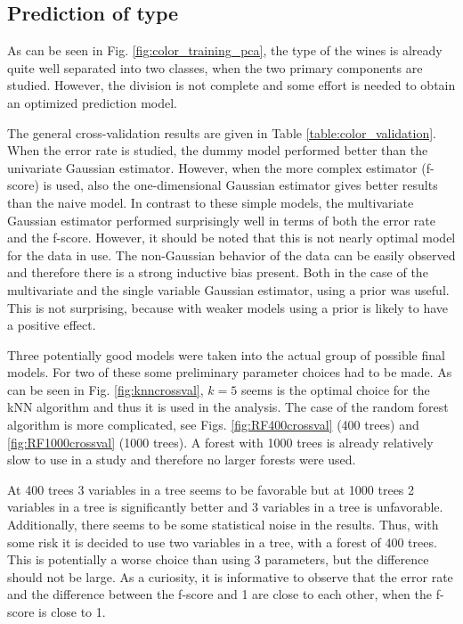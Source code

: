 \documentclass[twoside]{article}
\begin{document}
\begin{multicols}{2}
\subsection{Prediction of type}

As can be seen in Fig. \ref{fig:color_training_pca}, the type of the wines is already quite well separated into two 
classes, when the two primary components are studied. However, the division is not complete and some effort is needed
to obtain an optimized prediction model.

The general cross-validation results are given in Table \ref{table:color_validation}. When the error
rate is studied, the dummy model performed better than the univariate Gaussian estimator. However, when the more complex estimator (f-score) is used,
also the one-dimensional Gaussian estimator gives better results than the naive model. In contrast to these simple models,
the multivariate Gaussian estimator performed surprisingly well in terms of both the error rate and the f-score.
However, it should be noted that this is not nearly optimal model for the data in use. The non-Gaussian behavior
of the data can be easily observed and therefore there is a strong inductive bias present. Both in the case of the
multivariate and the single variable Gaussian estimator, using a prior was useful. This is not surprising, because
with weaker models using a prior is likely to have a positive effect.

Three potentially good models were taken into the actual group of possible final models. For two of these some preliminary
parameter choices had to be made. As can be seen in Fig. \ref{fig:knncrossval}, $k = 5$ seems is the optimal choice
for the kNN algorithm and thus it is used in the analysis. The case of the random forest algorithm is more complicated, see
Figs. \ref{fig:RF400crossval} (400 trees) and \ref{fig:RF1000crossval} (1000 trees).
A forest with 1000 trees is already relatively slow to use in a study and therefore no larger forests were used. 

At 400
trees 3 variables in a tree seems to be favorable but at 1000 trees 2 variables in a tree is significantly better and 3 variables
in a tree is unfavorable. Additionally, there seems to be some statistical noise in the results. Thus, with some risk it is
decided to use two variables in a tree, with a forest of 400 trees. This is potentially a worse choice than using 3 parameters,
but the difference should not be large. As a curiosity, it is informative to observe that the error rate and the difference between the
f-score and 1 are close to each other, when the f-score is close to 1.


\end{multicols}
\end{document}
